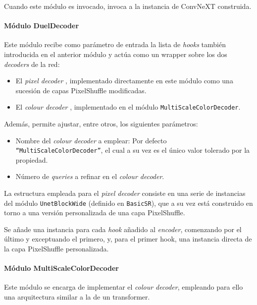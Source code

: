 \documentclass[a4paper]{article}
\begin{document}
Cuando este módulo es invocado, invoca a la instancia de ConvNeXT construida.

\paragraph{Módulo DuelDecoder}

Este módulo recibe como parámetro de entrada la lista de \textit{hooks} también introducida en el anterior módulo y actúa como un wrapper sobre los dos \textit{decoders} de la red:

\begin{itemize}
  \item{El \textit{pixel decoder} \cite{DDColor}, implementado directamente en este módulo como una sucesión de capas PixelShuffle \cite{PixelShuffle} modificadas.}
  \item{El \textit{colour decoder} \cite{DDColor}, implementado en el módulo \texttt{MultiScaleColorDecoder}.}
\end{itemize}

Además, permite ajustar, entre otros, los siguientes parámetros:

\begin{itemize}
  \item{Nombre del \textit{colour decoder} a emplear: Por defecto \texttt{``MultiScaleColorDecoder''}, el cual a su vez es el único valor tolerado por la propiedad.}
  \item{Número de \textit{queries} a refinar en el \textit{colour decoder}.}
\end{itemize}

La estructura empleada para el \textit{pixel decoder} consiste en una serie de instancias del módulo \texttt{UnetBlockWide} (definido en \texttt{BasicSR}), que a su vez está construido en torno a una versión personalizada de una capa PixelShuffle.

Se añade una instancia para cada \textit{hook} añadido al \textit{encoder}, comenzando por el último y exceptuando el primero, y, para el primer hook, una instancia directa de la capa PixelShuffle personalizada.

\paragraph{Módulo MultiScaleColorDecoder}

Este módulo se encarga de implementar el \textit{colour decoder}, empleando para ello una arquitectura similar a la de un transformer.
\end{document}
